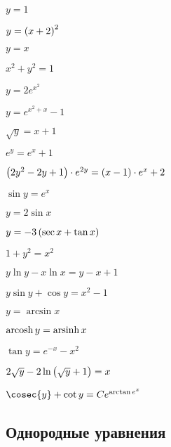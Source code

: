 \begin{enumsols}
		\label{sol:firstorder:separable_cauchy}
		\item \( y = 1 \) %
		\item \( y = \left( x + 2 \right)^2 \) %
		\item \( y = x \) %
		\item \( x^2 + y^2 = 1 \) %
		\item \( y = 2e^{x^2} \) %
		\item \( y = e^{x^2 + x} - 1 \) %
		\item \( \sqrt{y} = x + 1 \) %
		\item \( e^{y} = e^{x} + 1 \) %
		\item \( \left( 2y^2 - 2y + 1 \right) \cdot e^{2y} = \left( x - 1 \right) \cdot e^{x} + 2 \) %
		\item \( \sin{y} = e^{x} \) %
		\item \( y = 2\sin{x} \) %
		\item \( y = -3 \left( \sec{x} + \tan{x} \right) \) %
		\item \( 1 + y^2 = x^2 \) %
		\item \( y \ln{y} - x \ln{x} = y - x + 1 \) %
		\item \( y \sin{y} + \cos{y} = x^2 - 1 \) %
		\item \( y = \arcsin{x} \) %
		\item \( \operatorname{arcosh}{y} = \operatorname{arsinh}{x} \) %
		\item \( \tan{y} = e^{-x} - x^2 \) %
		\item \( 2\sqrt{y} - 2 \ln\left( \sqrt{y} + 1 \right) = x \) %
		\item \( \cosec{y} + \cot{y} = Ce^{\arctan{e^x}} \) %
	
	\end{enumsols}

\subsection*{Однородные уравнения}

